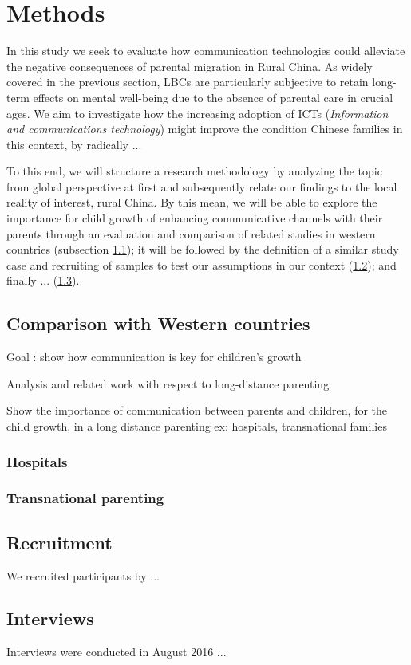 \section{Methods}
\label{methods}


In this study we seek to evaluate how communication technologies could alleviate the negative consequences of parental migration in Rural China. As widely covered in the previous section, LBCs are particularly subjective to retain long-term effects on mental well-being due to the absence of parental care in crucial ages. We aim to investigate how the increasing adoption of ICTs (\textit{Information and communications technology}) might improve the condition Chinese families in this context, by radically ...

To this end, we will structure a research methodology by analyzing the topic from global perspective at first and subsequently relate our findings to the local reality of interest, rural China. By this mean, we will be able to explore the importance for child growth of enhancing communicative channels with their parents through an evaluation and comparison of related studies in western countries (subsection \ref{methods-compare}); it will be followed by the definition of a similar study case and recruiting of samples to test our assumptions in our context (\ref{methods-recruitment}); and finally ... (\ref{methods-interviews}).

\subsection{Comparison with Western countries}
\label{methods-compare}

Goal : show how communication is key for children's growth

Analysis and related work with respect to long-distance parenting 

Show the importance of communication between parents and children, for the child growth, in a long distance parenting 
ex: hospitals, transnational families

\subsubsection{Hospitals}

\subsubsection{Transnational parenting}


\subsection{Recruitment}
\label{methods-recruitment}
We recruited participants by ...

\subsection{Interviews}
\label{methods-interviews}
Interviews were conducted in August 2016 ...